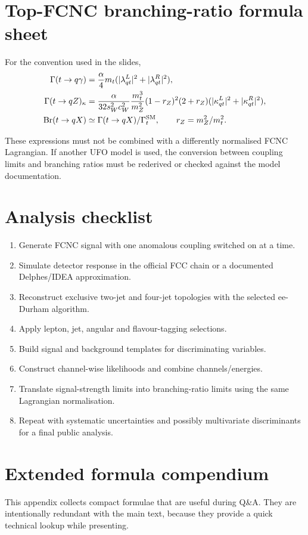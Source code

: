 \documentclass[11pt,a4paper]{report}
\newcommand{\br}{\mathrm{Br}}
\begin{document}
\chapter{Top-FCNC branching-ratio formula sheet}
For the convention used in the slides,
\begin{align}
\Gamma(t\to q\gamma)&=\frac{\alpha}{4}m_t(|\lambda^L_{qt}|^2+|\lambda^R_{qt}|^2),\\
\Gamma(t\to qZ)_\kappa&=\frac{\alpha}{32s_W^2c_W^2}\frac{m_t^3}{m_Z^2}(1-r_Z)^2(2+r_Z)(|\kappa^L_{qt}|^2+|\kappa^R_{qt}|^2),\\
\br(t\to qX)&\simeq\Gamma(t\to qX)/\Gamma_t^{\rm SM},\qquad r_Z=m_Z^2/m_t^2.
\end{align}
\begin{warningbox}
These expressions must not be combined with a differently normalised FCNC Lagrangian.  If another UFO model is used, the conversion between coupling limits and branching ratios must be rederived or checked against the model documentation.
\end{warningbox}

\chapter{Analysis checklist}
\begin{enumerate}
\item Generate FCNC signal with one anomalous coupling switched on at a time.
\item Simulate detector response in the official FCC chain or a documented Delphes/IDEA approximation.
\item Reconstruct exclusive two-jet and four-jet topologies with the selected ee-Durham algorithm.
\item Apply lepton, jet, angular and flavour-tagging selections.
\item Build signal and background templates for discriminating variables.
\item Construct channel-wise likelihoods and combine channels/energies.
\item Translate signal-strength limits into branching-ratio limits using the same Lagrangian normalisation.
\item Repeat with systematic uncertainties and possibly multivariate discriminants for a final public analysis.
\end{enumerate}


\chapter{Extended formula compendium}
This appendix collects compact formulae that are useful during Q\&A.  They are intentionally redundant with the main text, because they provide a quick technical lookup while presenting.
\end{document}
